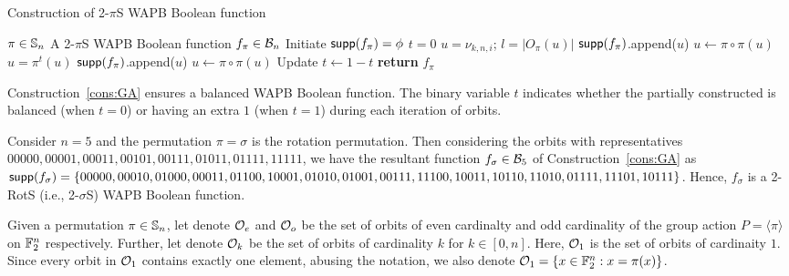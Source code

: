 \documentclass{llncs}
\begin{document}
\begin{constr}
\caption{Construction of 2-$\pi$S WAPB Boolean function\label{cons:GA}}
\begin{algorithmic}
\Require $\pi \in \mathbb{S}_n$ %
\Ensure A 2-$\pi$S WAPB Boolean function $f_\pi \in \mathcal{B}_n$
\State Initiate $\mathsf{supp}(f_\pi) = \phi$
\State $t = 0$
		\State $u = \nu_{k,n,i}$; $l= |O_\pi(u)|$
				\State $\mathsf{supp}(f_\pi)$.append($u$)
				\State $ u \gets \pi \circ \pi(u)$
			\EndFor
		\Else
			\State $u = \pi^{t}(u)$
				\State $\mathsf{supp}(f_\pi)$.append($u$)
				\State $ u \gets \pi \circ \pi(u)$ 
			\EndFor 
			\State Update $t \gets 1 - t$
		\EndIf
	\EndFor
\EndFor
\State \textbf{return} $f_\pi$
\end{algorithmic}

\end{constr}
Construction~\ref{cons:GA} ensures a balanced WAPB Boolean function. The binary variable $t$ indicates whether the partially constructed is balanced (when $t = 0$) or having an extra $1$ (when $t = 1$) during each iteration of orbits.
\begin{example}
Consider $n = 5$ and the permutation $\pi = \sigma$ is the rotation permutation. Then considering the orbits with representatives $00000, 00001, 00011, 00101, 00111, 01011, 01111, 11111$, we have the resultant function $f_{\sigma} \in \mathcal{B}_{5}$ of Construction~\ref{cons:GA} as $\mathsf{supp}(f_{\sigma}) = \{00000, 00010, 01000, 00011, 01100, 10001, 01010, 01001, 00111,\\ 11100, 10011, 10110, 11010, 01111, 11101, 10111\}$.
Hence, $f_{\sigma}$ is a 2-RotS (i.e., 2-$\sigma$S) WAPB Boolean function.
\end{example}

Given a permutation $\pi \in \mathbb{S}_n$, let denote $\mathcal{O}_e$ and $\mathcal{O}_o$ be the set of orbits of even cardinalty and  odd cardinality of the group action $P = \langle \pi \rangle$ on $\mathbb{F}_2^n$ respectively. Further, let denote $\mathcal{O}_k$ be the set of orbits of cardinality $k$ for $k \in [0,n]$. Here, $\mathcal{O}_1$ is the set of orbits of cardinaity $1$. Since every orbit in $\mathcal{O}_1$ contains exactly one element, abusing the notation, we also denote $\mathcal{O}_1 = \{x \in \mathbb{F}_2^n : x = \pi(x)\}$.
\end{document}
